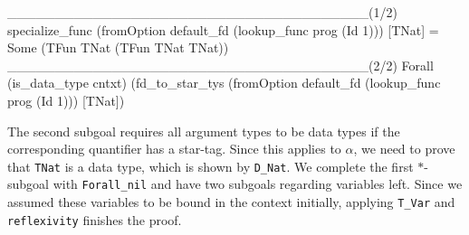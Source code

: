 \documentclass[paper = a4, fleqn, abstract=on, twoside]{scrreprt}
\newcommand{\coqinline}[1]{\texttt{#1}}
\begin{document}
\begin{coqcode}
______________________________________(1/2)
specialize_func (fromOption default_fd (lookup_func prog (Id 1))) [TNat] =
Some (TFun TNat (TFun TNat TNat))
______________________________________(2/2)
Forall (is_data_type cntxt)
(fd_to_star_tys (fromOption default_fd (lookup_func prog (Id 1))) [TNat])
\end{coqcode}
The second subgoal requires all argument types to be data types if the corresponding quantifier has a star-tag. Since this applies to $\alpha$, we need to prove that \coqinline{TNat} is a data type, which is shown by \coqinline{D_Nat}. We complete the first $*$-subgoal with \coqinline{Forall_nil} and have two subgoals regarding variables left. Since we assumed these variables to be bound in the context initially, applying \coqinline{T_Var} and \coqinline{reflexivity} finishes the proof.
\newpage
\end{document}
